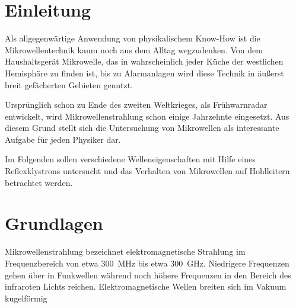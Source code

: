 \section{Einleitung}
\label{sec:einleitung}
Als allgegenwärtige Anwendung von physikalischem Know-How ist die
Mikrowellentechnik kaum noch aus dem Alltag wegzudenken.
Von dem Haushaltsgerät Mikrowelle, das in wahrscheinlich jeder Küche der
westlichen Hemisphäre zu finden ist, bis zu Alarmanlagen wird diese Technik
in äußerst breit gefächerten Gebieten genutzt.

Ursprünglich schon zu Ende des zweiten Weltkrieges, als Frühwarnradar
entwickelt, wird Mikrowellenstrahlung schon einige Jahrzehnte eingesetzt.
Aus diesem Grund stellt sich die Untersuchung von Mikrowellen als interessante
Aufgabe für jeden Physiker dar.

Im Folgenden sollen verschiedene Welleneigenschaften mit Hilfe eines
Reflexklystrons untersucht und das Verhalten von Mikrowellen auf Hohlleitern
betrachtet werden.

\section{Grundlagen}
\label{sec:grundlagen}
Mikrowellenstrahlung bezeichnet elektromagnetische Strahlung im Frequenzbereich
von etwa \SI{300}{\mega \hertz} bis etwa \SI{300}{\giga \hertz}.
Niedrigere Frequenzen gehen über in Funkwellen während noch höhere Frequenzen
in den Bereich des infraroten Lichts reichen.
Elektromagnetische Wellen breiten sich im Vakuum kugelförmig
